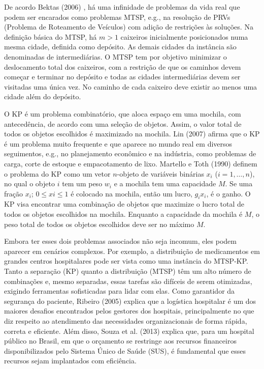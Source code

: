 De acordo Bektas (2006) \cite{bektas2006multiple}, há uma infinidade de problemas da vida real que podem ser encarados como problemas MTSP, e.g., na resolução de PRVs (Problema de Roteamento de Veículos) com adição de restrições às soluções. Na definição básica do MTSP, há $m > 1$ caixeiros inicialmente posicionados numa mesma cidade, definida como depósito. As demais cidades da instância são denominadas de intermediárias. O MTSP tem por objetivo minimizar o deslocamento total dos caixeiros, com a restrição de que os caminhos devem começar e terminar no depósito e todas as cidades intermediárias devem ser visitadas uma única vez. No caminho de cada caixeiro deve existir ao menos uma cidade além do depósito.

O KP é um problema combinatório, que aloca espaço em uma mochila, com antecedência, de acordo com uma seleção de objetos. Assim, o valor total de todos os objetos escolhidos é maximizado na mochila. Lin (2007) \cite{lin2008solving} afirma que o KP é um problema muito frequente e que aparece no mundo real em diversos seguimentos, e.g., no planejamento econômico e na indústria, como problemas de carga, corte de estoque e empacotamento de lixo. Martello e Toth (1990) \cite{Martello:1990:KPA:98124} definem o problema do KP como um vetor $n$-objeto de variáveis binárias $x_i$ ($i = 1,…, n$), no qual o objeto $i$ tem um peso $w_i$ e a mochila tem uma capacidade $M$. Se uma fração $x_i$; $0 \leq xi \leq 1$ é colocado na mochila, então um lucro, $g_i x_i$, é o ganho. O KP visa encontrar uma combinação de objetos que maximize o lucro total de todos os objetos escolhidos na mochila. Enquanto a capacidade da mochila é $M$, o peso total de todos os objetos escolhidos deve ser no máximo $M$.

Embora ter esses dois problemas associados não seja incomum, eles podem aparecer em cenários complexos. Por exemplo, a distribuição de medicamentos em grandes centros hospitalares pode ser vista como uma instância do MTSP-KP. Tanto a separação (KP) quanto a distribuição (MTSP) têm um alto número de combinações e, mesmo separadas, essas tarefas são difíceis de serem otimizadas, exigindo ferramentas sofisticadas para lidar com elas. Como garantidor da segurança do paciente, Ribeiro (2005) \cite{ribeiro_2005} explica que a logística hospitalar é um dos maiores desafios encontrados pelos gestores dos hospitais, principalmente no que diz respeito ao atendimento das necessidades organizacionais de forma rápida, correta e eficiente. Além disso, Souza et al. (2013) \cite{de2013logistica} explica que, para um hospital público no Brasil, em que o orçamento se restringe aos recursos financeiros disponibilizados pelo Sistema Único de Saúde (SUS), é fundamental que esses recursos sejam implantados com eficiência.

